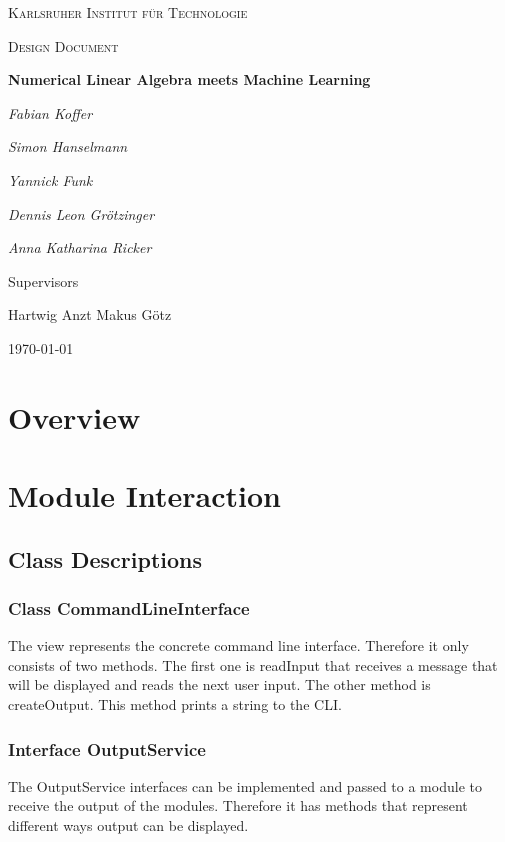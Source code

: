 \documentclass[parskip=full]{scrartcl}
\begin{document}
\begin{titlepage}
\centering
{\scshape\LARGE Karlsruher Institut für Technologie\par}
\vspace{1cm}
{\scshape\Large Design Document\par}
\vspace{1.5cm}
{\huge\bfseries Numerical Linear Algebra meets Machine Learning \par}
\vspace {2cm}

{\Large\itshape Fabian Koffer\par}
{\Large\itshape Simon Hanselmann\par}
{\Large\itshape Yannick Funk\par}
{\Large\itshape Dennis Leon Gr\"{o}tzinger\par}
{\Large\itshape Anna Katharina Ricker\par}

\vfill
Supervisors\par
Hartwig Anzt
Makus G\"{o}tz

\vfill
{\large\today\par}
\end{titlepage}

\tableofcontents
\newpage

\section{Overview}


\section{Module Interaction}

\subsection{Class Descriptions}

\subsubsection{Class CommandLineInterface}
The view represents the concrete command line interface. 
Therefore it only consists of two methods. 
The first one is readInput that receives a message that will be displayed and reads the next user input. 
The other method is createOutput. 
This method prints a string to the CLI.

\subsubsection{Interface OutputService}
The OutputService interfaces can be implemented and passed to a module to receive the output of the modules. 
Therefore it has methods that represent different ways output can be displayed. 
\end{document}

